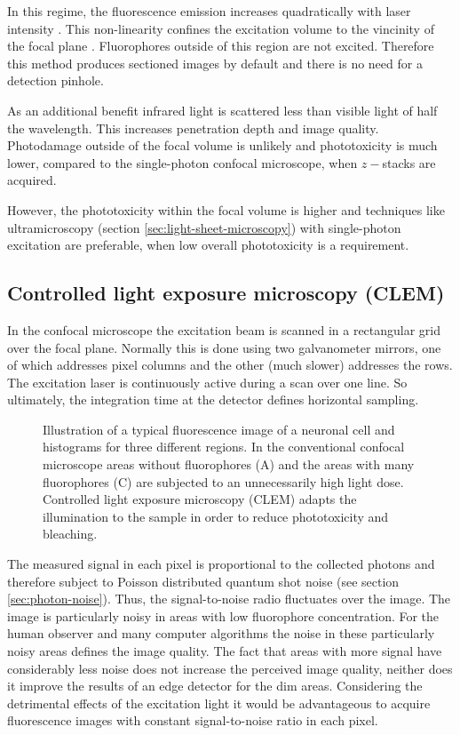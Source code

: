 In this regime, the fluorescence emission increases quadratically with
laser intensity \citep{goppert1931elementarakte}. This non-linearity
confines the excitation volume to the vincinity of the focal plane
\citep{Denk1990}. Fluorophores outside of this region are not
excited. Therefore this method produces sectioned images by default
and there is no need for a detection pinhole.

As an additional benefit infrared light is scattered less than visible
light of half the wavelength. This increases penetration depth and
image quality. Photodamage outside of the focal volume is unlikely and
phototoxicity is much lower, compared to the single-photon confocal
microscope, when $z-$stacks are acquired.

However, the phototoxicity within the focal volume is higher and
techniques like ultramicroscopy (section
\ref{sec:light-sheet-microscopy}) with single-photon excitation are
preferable, when low overall phototoxicity is a requirement.
\subsection{Controlled light exposure microscopy (CLEM)}
\label{sec:CLEM}
In the confocal microscope the excitation beam is scanned in a
rectangular grid over the focal plane. Normally this is done using two
galvanometer mirrors, one of which addresses pixel columns and the
other (much slower) addresses the rows. The excitation laser is
continuously active during a scan over one line. So ultimately, the
integration time at the detector defines horizontal sampling.
\begin{figure}[hbtp]
  \centering
  \caption{Illustration of a typical fluorescence image
    of a neuronal cell and histograms for three different regions. In
    the conventional confocal microscope areas without fluorophores
    (A) and the areas with many fluorophores (C) are subjected to an
    unnecessarily high light dose. Controlled light exposure
    microscopy (CLEM) adapts the illumination to the sample in order
    to reduce phototoxicity and bleaching.}
  \label{fig:clem}
\end{figure}

The measured signal in each pixel is proportional to the collected
photons and therefore subject to Poisson distributed quantum shot
noise (see section \ref{sec:photon-noise}). Thus, the signal-to-noise
radio fluctuates over the image. The image is particularly noisy in
areas with low fluorophore concentration. For the human observer and
many computer algorithms the noise in these particularly noisy areas
defines the image quality. The fact that areas with more signal have
considerably less noise does not increase the perceived image quality,
neither does it improve the results of an edge detector for the dim
areas. Considering the detrimental effects of the excitation light it
would be advantageous to acquire fluorescence images with constant
signal-to-noise ratio in each pixel.



